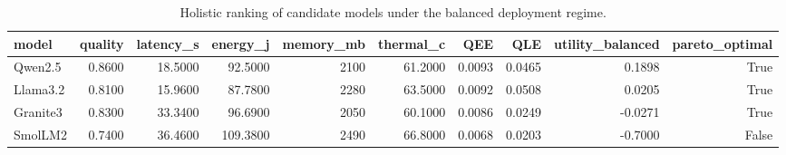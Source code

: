 \begin{table}
\caption{Holistic ranking of candidate models under the balanced deployment regime.}
\label{tab:main_ranking}
\begin{tabular}{lrrrrrrrrr}
\toprule
model & quality & latency_s & energy_j & memory_mb & thermal_c & QEE & QLE & utility_balanced & pareto_optimal \\
\midrule
Qwen2.5 & 0.8600 & 18.5000 & 92.5000 & 2100 & 61.2000 & 0.0093 & 0.0465 & 0.1898 & True \\
Llama3.2 & 0.8100 & 15.9600 & 87.7800 & 2280 & 63.5000 & 0.0092 & 0.0508 & 0.0205 & True \\
Granite3 & 0.8300 & 33.3400 & 96.6900 & 2050 & 60.1000 & 0.0086 & 0.0249 & -0.0271 & True \\
SmolLM2 & 0.7400 & 36.4600 & 109.3800 & 2490 & 66.8000 & 0.0068 & 0.0203 & -0.7000 & False \\
\bottomrule
\end{tabular}
\end{table}
